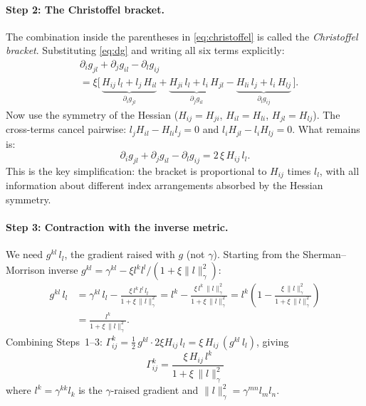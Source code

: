 \documentclass{article}
\begin{document}
\paragraph{Step 2: The Christoffel bracket.}
The combination inside the parentheses in \eqref{eq:christoffel}
is called the \emph{Christoffel bracket}.
Substituting \eqref{eq:dg} and writing all six terms explicitly:
\begin{align}
    &\partial_i g_{jl} + \partial_j g_{il} - \partial_l g_{ij} \nonumber\\
    &= \xi\bigl[\,
      \underbrace{H_{ij}\,l_l + l_j\,H_{il}}_{\partial_i g_{jl}}
    + \underbrace{H_{ji}\,l_l + l_i\,H_{jl}}_{\partial_j g_{il}}
    - \underbrace{H_{li}\,l_j + l_i\,H_{lj}}_{\partial_l g_{ij}}
    \,\bigr]. \label{eq:bracket-expanded}
\end{align}
Now use the symmetry of the Hessian ($H_{ij}=H_{ji}$, $H_{il}=H_{li}$, $H_{jl}=H_{lj}$).
The cross-terms cancel pairwise:
$l_j H_{il} - H_{li} l_j = 0$ and $l_i H_{jl} - l_i H_{lj} = 0$.
What remains is:
\begin{equation}\label{eq:bracket}
    \boxed{\;
    \partial_i g_{jl} + \partial_j g_{il} - \partial_l g_{ij}
    = 2\,\xi\,H_{ij}\,l_l.
    \;}
\end{equation}
This is the key simplification: the bracket is proportional to $H_{ij}$
times $l_l$, with all information about different index arrangements
absorbed by the Hessian symmetry.

\paragraph{Step 3: Contraction with the inverse metric.}
We need $g^{kl}\,l_l$, the gradient raised with $g$ (not $\gamma$).
Starting from the Sherman--Morrison inverse
$g^{kl} = \gamma^{kl} - \xi l^k l^l/(1+\xi\|l\|_\gamma^2)$:
\begin{align}
    g^{kl}\,l_l
    &= \gamma^{kl}\,l_l - \frac{\xi\,l^k\,l^l\,l_l}{1+\xi\,\|l\|_\gamma^2}
    = l^k - \frac{\xi\,l^k\,\|l\|_\gamma^2}{1+\xi\,\|l\|_\gamma^2}
    = l^k\left(1 - \frac{\xi\,\|l\|_\gamma^2}{1+\xi\,\|l\|_\gamma^2}\right) \nonumber\\
    &= \frac{l^k}{1+\xi\,\|l\|_\gamma^2}. \label{eq:ginv-l}
\end{align}
Combining Steps~1--3:
$\Gamma^k_{ij} = \frac{1}{2}\,g^{kl}\cdot 2\xi H_{ij}\,l_l
= \xi\,H_{ij}\,(g^{kl}\,l_l)$, giving
\begin{equation}\label{eq:chris-closed}
    \boxed{\;
    \Gamma^k_{ij}
    = \frac{\xi\,H_{ij}\,l^k}{1+\xi\,\|l\|_\gamma^2}
    \;}
\end{equation}
where $l^k=\gamma^{kk}l_k$ is the $\gamma$-raised gradient
and $\|l\|_\gamma^2=\gamma^{mn}l_m l_n$.
\end{document}
